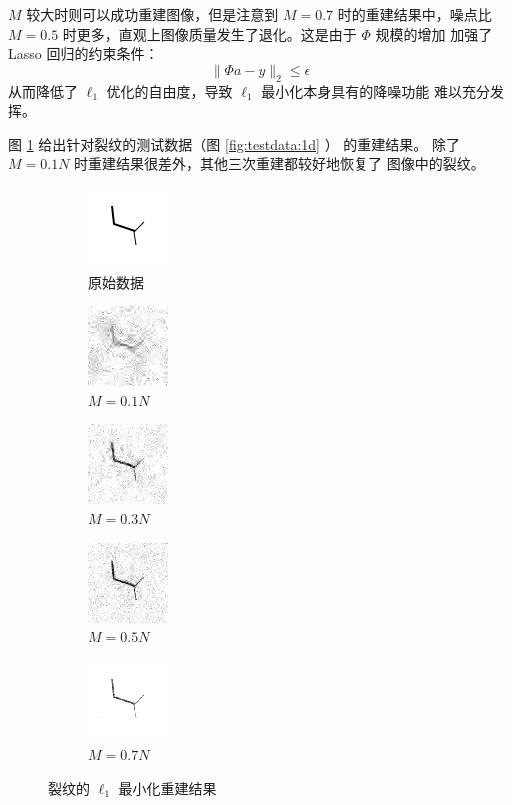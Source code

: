 $M$ 较大时则可以成功重建图像，但是注意到 $M=0.7$ 时的重建结果中，噪点比
$M=0.5$ 时更多，直观上图像质量发生了退化。这是由于 $\Phi$ 规模的增加
加强了 Lasso 回归的约束条件：
\begin{equation}
\|\Phi a - y\|_2 \leq \epsilon
\end{equation}
从而降低了 $\ell_1$ 优化的自由度，导致 $\ell_1$ 最小化本身具有的降噪功能
难以充分发挥。

图 \ref{fig:L11d} 给出针对裂纹的测试数据（图 \ref{fig:testdata:1d} ）
的重建结果。
除了 $M = 0.1N$ 时重建结果很差外，其他三次重建都较好地恢复了
图像中的裂纹。

\begin{figure}
\centering
\begin{subfigure}[t]{1.1in}
	\includegraphics{Figure/testdata/1d.png}
	\caption{原始数据}
\end{subfigure}
\begin{subfigure}[t]{1.1in}
	\includegraphics{Figure/L1/1d10.png}
	\caption{$M = 0.1 N$}
\end{subfigure}
\begin{subfigure}[t]{1.1in}
	\includegraphics{Figure/L1/1d30.png}
	\caption{$M = 0.3 N$}
\end{subfigure}
\begin{subfigure}[t]{1.1in}
	\includegraphics{Figure/L1/1d50.png}
	\caption{$M = 0.5 N$}
\end{subfigure}
\begin{subfigure}[t]{1.1in}
	\includegraphics{Figure/TV/1d70.png}
	\caption{$M = 0.7 N$}
\end{subfigure}
\caption{裂纹的 $\ell_1$ 最小化重建结果}
\label{fig:L11d}
\end{figure}

